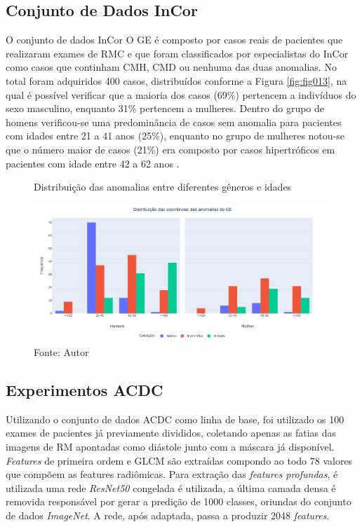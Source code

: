 \subsection{Conjunto de Dados InCor} 
\label{subsec:cap5_incor}

O conjunto de dados \gls{InCor} O GE é composto por casos reais de pacientes que realizaram exames de RMC e que foram classificados por especialistas do \gls{InCor} como casos que continham CMH, CMD ou nenhuma das duas anomalias. No total foram adquiridos 400 casos, distribuídos conforme a Figura \ref{fig:fig013}, na qual é possível verificar que a maioria dos casos (69\%) pertencem a indivíduos do sexo masculino, enquanto 31\% pertencem a mulheres. Dentro do grupo de homens verificou-se uma predominância de casos sem anomalia para pacientes com idades entre 21 a 41 anos (25\%), enquanto no grupo de mulheres notou-se que o número maior de casos (21\%) era composto por casos hipertróficos em pacientes com idade entre 42 a 62 anos \cite{bergamascoRECUPERACAOOBJETOSMEDICOS2018}.

\begin{figure}[htbp]
    \centering
    \caption{Distribuição das anomalias entre diferentes gêneros e idades}
    \includegraphics[width=1\textwidth]{figures/fig012.png}
    \caption*{Fonte: Autor}
    \label{fig:fig012}
\end{figure}

\subsection{Experimentos ACDC}
\label{subsec:cap5_experimentos_acdc}

Utilizando o conjunto de dados \gls{ACDC} como linha de base, foi utilizado os 100 exames de pacientes já previamente divididos, coletando apenas as fatias das imagens de RM apontadas como diástole junto com a máscara já disponível. \textit{Features} de primeira ordem e \gls{GLCM} são extraídas compondo ao todo 78 valores que compõem as features radiômicas. Para extração das \textit{features profundas}, é utilizada uma rede \textit{ResNet50} congelada é utilizada, a última camada densa é removida responsável por gerar a predição de 1000 classes, oriundas do conjunto de dados \textit{ImageNet}. A rede, após adaptada, passa a produzir 2048 \textit{features}.

